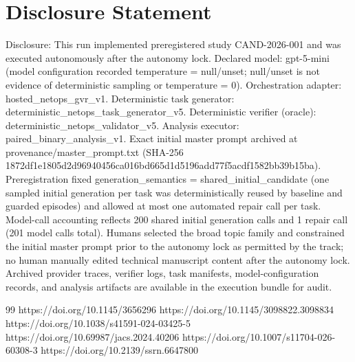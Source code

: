 \documentclass[conference]{IEEEtran}
\begin{document}
\section*{Disclosure Statement}
Disclosure: This run implemented preregistered study CAND-2026-001 and was executed autonomously after the autonomy lock. Declared model: gpt-5-mini (model configuration recorded temperature = null/unset; null/unset is not evidence of deterministic sampling or temperature = 0). Orchestration adapter: hosted\_netops\_gvr\_v1. Deterministic task generator: deterministic\_netops\_task\_generator\_v5. Deterministic verifier (oracle): deterministic\_netops\_validator\_v5. Analysis executor: paired\_binary\_analysis\_v1. Exact initial master prompt archived at provenance/master\_prompt.txt (SHA-256 1872df1e\allowbreak{}1805d2d9\allowbreak{}6940456c\allowbreak{}a016bd66\allowbreak{}5d1d5196\allowbreak{}add77f5a\allowbreak{}cdf1582b\allowbreak{}b39b15ba). Preregistration fixed generation\_semantics = shared\_initial\_candidate (one sampled initial generation per task was deterministically reused by baseline and guarded episodes) and allowed at most one automated repair call per task. Model-call accounting reflects 200 shared initial generation calls and 1 repair call (201 model calls total). Humans selected the broad topic family and constrained the initial master prompt prior to the autonomy lock as permitted by the track; no human manually edited technical manuscript content after the autonomy lock. Archived provider traces, verifier logs, task manifests, model-configuration records, and analysis artifacts are available in the execution bundle for audit.

\begin{thebibliography}{99}
 https://doi.org/10.1145/3656296
 https://doi.org/10.1145/3098822.3098834
 https://doi.org/10.1038/s41591-024-03425-5
 https://doi.org/10.69987/jacs.2024.40206
 https://doi.org/10.1007/s11704-026-60308-3
 https://doi.org/10.2139/ssrn.6647800
\end{thebibliography}
\end{document}
